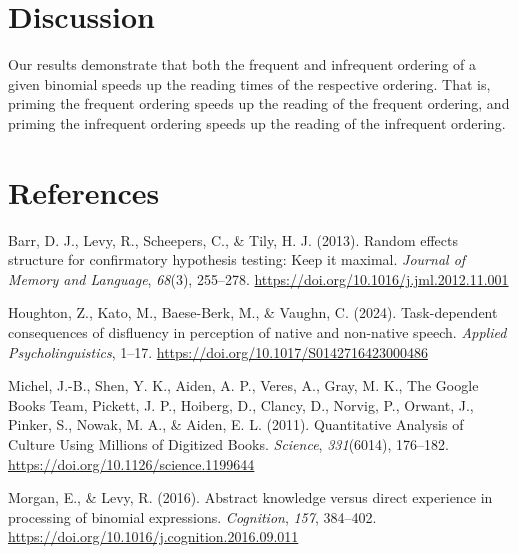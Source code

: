 \documentclass[
  12pt,
]{scrartcl}
\newlength{\cslhangindent}
\newenvironment{CSLReferences}[2] %
 {\begin{list}{}{%
  \setlength{\itemindent}{0pt}
  \setlength{\leftmargin}{0pt}
  \setlength{\parsep}{0pt}
  \ifodd #1
   \setlength{\leftmargin}{\cslhangindent}
   \setlength{\itemindent}{-1\cslhangindent}
  \fi
  \setlength{\itemsep}{#2\baselineskip}}}
 {\end{list}}
\begin{document}
\section{Discussion}\label{discussion}

Our results demonstrate that both the frequent and infrequent ordering
of a given binomial speeds up the reading times of the respective
ordering. That is, priming the frequent ordering speeds up the reading
of the frequent ordering, and priming the infrequent ordering speeds up
the reading of the infrequent ordering.

\clearpage

\section*{References}\label{references}

\label{refs}
\begin{CSLReferences}{1}{0}
Barr, D. J., Levy, R., Scheepers, C., \& Tily, H. J. (2013). Random
effects structure for confirmatory hypothesis testing: Keep it maximal.
\emph{Journal of Memory and Language}, \emph{68}(3), 255--278.
\url{https://doi.org/10.1016/j.jml.2012.11.001}

Houghton, Z., Kato, M., Baese-Berk, M., \& Vaughn, C. (2024).
Task-dependent consequences of disfluency in perception of native and
non-native speech. \emph{Applied Psycholinguistics}, 1--17.
\url{https://doi.org/10.1017/S0142716423000486}

Michel, J.-B., Shen, Y. K., Aiden, A. P., Veres, A., Gray, M. K., The
Google Books Team, Pickett, J. P., Hoiberg, D., Clancy, D., Norvig, P.,
Orwant, J., Pinker, S., Nowak, M. A., \& Aiden, E. L. (2011).
Quantitative Analysis of Culture Using Millions of Digitized Books.
\emph{Science}, \emph{331}(6014), 176--182.
\url{https://doi.org/10.1126/science.1199644}

Morgan, E., \& Levy, R. (2016). Abstract knowledge versus direct
experience in processing of binomial expressions. \emph{Cognition},
\emph{157}, 384--402.
\url{https://doi.org/10.1016/j.cognition.2016.09.011}

\end{CSLReferences}
\end{document}
